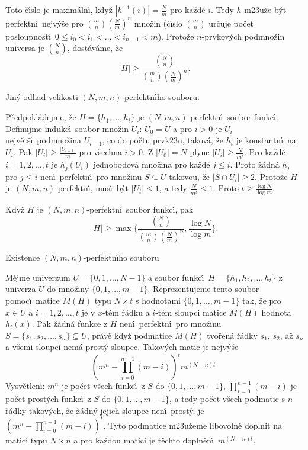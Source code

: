 \flushpar Toto \v c\'\i slo je maxim\'aln\'\i , kdy\v z $|h^{-1}(
i)|=\frac Nm$ pro ka\v zd\'e $i$. 
Tedy $h$ m\accent23u\v ze b\'yt perfektn\'\i\ nejv\'y\v se pro $\binom 
mn(\frac Nm)^n$ 
mno\v zin (\v c\'\i slo $\binom mn$ ur\v cuje po\v cet posloupnost\'\i\ 
$0\le i_0<i_1<\dots<i_{n-1}<m$). Proto\v ze $n$-prvkov\'ych 
podmno\v zin universa je $\binom Nn$, dost\'av\'ame, \v ze 
$$|H|\ge\frac {\binom Nn}{\binom mn(\frac Nm)^n}.$$

\flushpar Jin\'y odhad velikosti $(N,m,n)$-perfektn\'\i ho souboru.
\medskip

\flushpar P\v redpokl\'adejme, \v ze $H=\{h_1,\dots,h_t\}$ je 
$(N,m,n)$-perfektn\'\i\ soubor funkc\'\i .  Definujme indukc\'\i\ 
soubor mno\v zin $U_i$:\newline 
$U_0=U$ a pro 
$i>0$ je $U_i$ nejv\v et\v s\'\i\ podmno\v zina $U_{i-1}$, co do po\v ctu 
prvk\accent23u, 
takov\'a, \v ze $h_i$ je konstantn\'\i\ na $U_i$.  Pak $|U_i|\ge\frac {
|U_{i-1}|}m$ 
pro v\v sechna $i>0$.  Z $|U_0|=N$ plyne $|U_i|\ge\frac N{m^i}$.  Pro ka\v zd\'e 
$i=1,2,\dots,t$ je $h_j(U_i)$ jednobodov\'a mno\v zina pro ka\v zd\'e 
$j\le i$.  Proto \v z\'adn\'a $h_j$ pro $j\le i$ nen\'\i\ perfektn\'\i\ pro 
mno\v zinu $S\subseteq U$ takovou, \v ze $|S\cap U_i|\ge 2$.  Proto\v ze $
H$ je 
$(N,m,n)$-perfektn\'\i , mus\'\i\ b\'yt $|U_t|\le 1$, a tedy $\frac 
N{m^t}\le 1$.  Proto 
$t\ge\frac {\log N}{\log m}$.    
\medskip

Kdy\v z $H$ je $(N,m,n)$-perfektn\'\i\ soubor 
funkc\'\i , pak 
$$|H|\ge\max\{\frac {\binom Nn}{\binom mn(\frac Nm)^n},\frac {\log 
N}{\log m}\}.$$
\endproclaim

\subhead
Existence $(N,m,n)$-perfektn\'\i ho souboru
\endsubhead
\smallskip

\flushpar M\v ejme univerzum $U=\{0,1,\dots,N-1\}$ a soubor 
funkc\'\i\ $H=\{h_1,h_2,\dots,h_t\}$ z univerza $U$ do mno\v ziny 
$\{0,1,\dots,m-1\}$.  Reprezentujeme tento soubor pomoc\'\i\ 
matice $M(H)$ typu $N\times t$ s hodnotami $\{0,1,\dots,m-1\}$ tak, 
\v ze pro $x\in U$ a $i=1,2,\dots,t$ je 
v $x$-t\'em \v r\'adku a $i$-t\'em sloupci matice $M(H)$ 
hodnota $h_i(x)$. Pak \v z\'adn\'a funkce z $H$ 
nen\'\i\ perfektn\'\i\ pro mno\v zinu $S=\{s_1,s_2,\dots,s_n\}\subseteq 
U$, 
pr\'av\v e kdy\v z podmatice $M(H)$ tvo\v re\-n\'a 
\v r\'adky $s_1$, $s_2$, a\v z $s_n$ a v\v semi sloupci nem\'a prost\'y sloupec. 
Ta\-ko\-v\'ych matic je nejv\'y\v se 
$$(m^n-\prod_{i=0}^{n-1}(m-i))^tm^{(N-n)t}.$$
\flushpar Vysv\v etlen\'\i :  $m^n$ je po\v cet v\v sech funkc\'\i\ z $
S$ do 
$\{0,1,\dots,m-1\}$, $\prod_{i=0}^{n-1}(m-i)$ je po\v cet prost\'ych funkc\'\i\ z $
S$ 
do $\{0,1,\dots,m-1\}$, a tedy po\v cet v\v sech podmatic s $n$ 
\v r\'adky takov\'ych, \v ze \v z\'adn\'y jejich sloupec nen\'\i\ prost\'y, je 
$(m^n-\prod_{i=0}^{n-1}(m-i))^t$.  Tyto podmatice m\accent23u\v zeme 
libovoln\v e doplnit na matici typu $N\times n$ a pro ka\v zdou 
matici je t\v echto dopln\v en\'\i\ $m^{(N-n)t}$.  
\medskip

